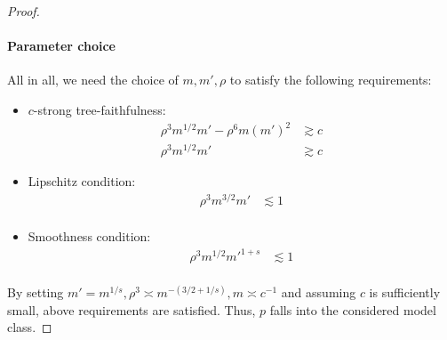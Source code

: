 \documentclass{article}
\theoremstyle{definition}
\theoremstyle{definition}
\theoremstyle{definition}
\theoremstyle{definition}
\theoremstyle{definition}
\theoremstyle{definition}
\theoremstyle{remark}
\theoremstyle{remark}
\begin{document}
\begin{proof}
    \paragraph{Parameter choice}
    All in all, we need the choice of $m,m',\rho$ to satisfy the following requirements:
    \begin{itemize}
        \item $c$-strong tree-faithfulness:
        \begin{align*}
            \rho^3m^{1/2}m' - \rho^6m(m')^2 & \gtrsim c \\
            \rho^3 m^{1/2}{m'} & \gtrsim c
        \end{align*}
        \item Lipschitz condition:
        \begin{align*}
            \rho^3 m^{3/2}m' & \lesssim 1 \\
        \end{align*}
        \item Smoothness condition:
        \begin{align*}
            \rho^3 m^{1/2} {m'}^{1 + s} & \lesssim 1 \\
        \end{align*}
    \end{itemize}
    By setting $ m'=m^{1/s}, \rho^3\asymp m^{-(3/2 + 1/s)}, m\asymp c^{-1}$ and assuming $c$ is sufficiently small, above requirements are satisfied. Thus, $p$ falls into the considered model class.
    

\end{proof}
\end{document}
